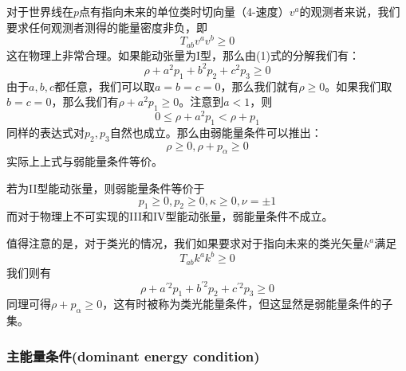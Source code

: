 \documentclass[hyperref, UTF8, a4paper]{ctexart}
\begin{document}
对于世界线在$p$点有指向未来的单位类时切向量（4-速度）$v^{a}$的观测者来说，我们要求任何观测者测得的能量密度非负，即
\begin{equation*}
	T_{ab} v^{a} v^{b} \geq 0
\end{equation*}
这在物理上非常合理。如果能动张量为I型，那么由(1)式的分解我们有：
\begin{equation*}
	\rho +a^{2} p_{1} +b^{2} p_{2} +c^{2} p_{3} \geq 0
\end{equation*}
由于$a,b,c$都任意，我们可以取$a=b=c=0$，那么我们就有$\rho \geq 0$。如果我们取$b=c=0$，那么我们有$\rho +a^{2} p_{1} \geq 0$。注意到$a< 1$，则
\begin{equation*}
	0\leq \rho +a^{2} p_{1} < \rho +p_{1}
\end{equation*}
同样的表达式对$p_{2} ,p_{3}$自然也成立。那么由弱能量条件可以推出：
\begin{equation*}
	\rho \geq 0,\rho +p_{\alpha } \geq 0
\end{equation*}
实际上上式与弱能量条件等价。

若为II型能动张量，则弱能量条件等价于
\begin{equation*}
	p_{1} \geq 0,p_{2} \geq 0,\kappa \geq 0,\nu =\pm 1
\end{equation*}
而对于物理上不可实现的III和IV型能动张量，弱能量条件不成立。

值得注意的是，对于类光的情况，我们如果要求对于指向未来的类光矢量$k^{a}$满足
\begin{equation*}
	T_{ab} k^{a} k^{b} \geq 0
\end{equation*}
我们则有
\begin{equation*}
	\rho +a^{\prime 2} p_{1} +b^{\prime 2} p_{2} +c^{\prime 2} p_{3} \geq 0
\end{equation*}
同理可得$\rho +p_{\alpha } \geq 0$，这有时被称为类光能量条件，但这显然是弱能量条件的子集。
\subsubsection{主能量条件(dominant energy condition)}
\end{document}
